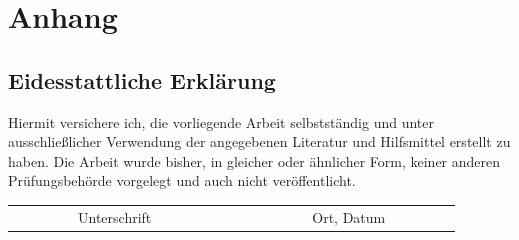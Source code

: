 \documentclass[a4paper,11pt,singlespacing]{article}
\begin{document}
\newpage


\section*{Anhang}\label{Anhang}
\newpage


\begin{newpage}
\vspace*{\fill}
\section*{Eidesstattliche Erklärung}\label{sec:Eidesstattliche Erklärung}
	Hiermit versichere ich, die vorliegende Arbeit selbstständig und unter ausschlie{\ss}licher Verwendung der angegebenen Literatur und Hilfsmittel erstellt zu haben. Die Arbeit wurde bisher, in gleicher oder ähnlicher Form, keiner anderen Prüfungsbehörde vorgelegt und auch nicht veröffentlicht.\\

\vspace{3cm}
\begin{tabular*}{\textwidth}{c@{\extracolsep\fill}cc}
\cline{1-1}
\cline{3-3}
\\
\ \ \ \ \ \ \ \ \ Unterschrift\ \ \ \ \ \ \ \ \ \ & & \ \ \ \ \ \ \ \ \ Ort, Datum\ \ \ \ \ \ \ \ \ \\
\end{tabular*}
\end{newpage}
\end{document}
